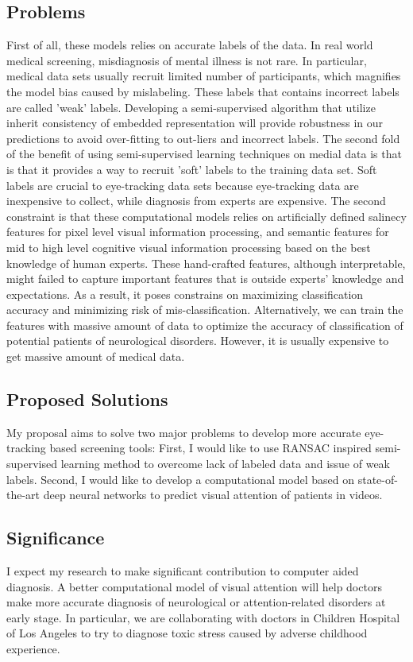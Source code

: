 \documentclass[a4paper, times, 12pt, ,onecolumn,oneside,top=1.0cm,bottom=1.0cm,left=1.0 cm,right=1cm]{article}
\begin{document}
\subsection{Problems}
First of all, these models relies on accurate labels of the data. In real world medical screening, misdiagnosis of mental illness is not rare. In particular, medical data sets usually recruit limited number of participants, which magnifies the model bias caused by mislabeling. These labels that contains incorrect labels are called 'weak' labels. Developing a semi-supervised algorithm that utilize inherit consistency of embedded representation will provide robustness in our predictions to avoid over-fitting to out-liers and incorrect labels. The second fold of the benefit of using semi-supervised learning techniques on medial data is that is that it provides a way to recruit 'soft' labels to the training data set. Soft labels are crucial to eye-tracking data sets because eye-tracking data are inexpensive to collect, while diagnosis from experts are expensive. The second constraint is that these computational models relies on artificially defined salinecy features for pixel level visual information processing, and semantic features for mid to high level cognitive visual information processing based on the best knowledge of human experts. These hand-crafted features, although interpretable, might failed to capture important features that is outside experts' knowledge and expectations.
As a result, it poses constrains on maximizing classification accuracy and  minimizing risk of mis-classification. Alternatively, we can train the features with massive amount of data to optimize the accuracy of classification of potential patients of neurological disorders. However, it is usually expensive to get massive amount of medical data. 

\subsection{Proposed Solutions}
My proposal aims to solve two major problems to develop more accurate eye-tracking based screening tools: First, I would like to use RANSAC inspired semi-supervised learning method to overcome lack of labeled data and issue of weak labels. Second, I would like to develop a computational model based on state-of-the-art deep neural networks to predict visual attention of patients in videos.

\subsection{Significance}
I expect my research to make significant contribution to computer aided diagnosis. A better computational model of visual attention will help doctors make more accurate diagnosis of neurological or attention-related disorders at early stage. In particular, we are collaborating with doctors in Children Hospital of Los Angeles to try to diagnose toxic stress caused by adverse childhood experience.    
\end{document}

